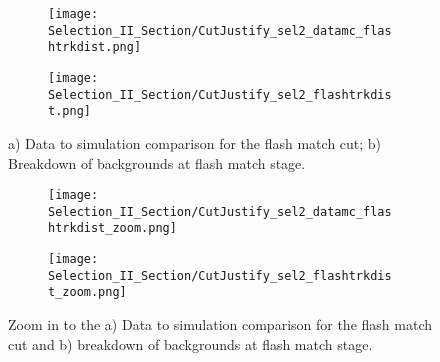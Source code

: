 \begin{figure}[H]
\centering
  \begin{subfigure}[t]{0.4\textwidth}
    \centering
\texttt{[image: Selection\_II\_Section/CutJustify\_sel2\_datamc\_flashtrkdist.png]}
    \caption{ }
  \end{subfigure} 
  \hspace{10 mm}
  \begin{subfigure}[t]{0.4\textwidth}
    \centering
\texttt{[image: Selection\_II\_Section/CutJustify\_sel2\_flashtrkdist.png]}
    \caption{ }
  \end{subfigure} 
\caption{ a) Data to simulation comparison for the flash match cut; b) Breakdown of backgrounds at flash match stage. }
\label{fig:cutjust_sel2_flashtrkdist}
\end{figure}

\begin{figure}[H]
\centering
  \begin{subfigure}[t]{0.4\textwidth}
    \centering
\texttt{[image: Selection\_II\_Section/CutJustify\_sel2\_datamc\_flashtrkdist\_zoom.png]}
    \caption{ }
  \end{subfigure} 
  \hspace{10 mm}
  \begin{subfigure}[t]{0.4\textwidth}
    \centering
\texttt{[image: Selection\_II\_Section/CutJustify\_sel2\_flashtrkdist\_zoom.png]}
   \caption{ }
  \end{subfigure} 
\caption{ Zoom in to the a) Data to simulation comparison for the flash match cut and b) breakdown of backgrounds at flash match stage. }
\label{fig:cutjust_sel2_flashtrkdist_zoom}
\end{figure}

